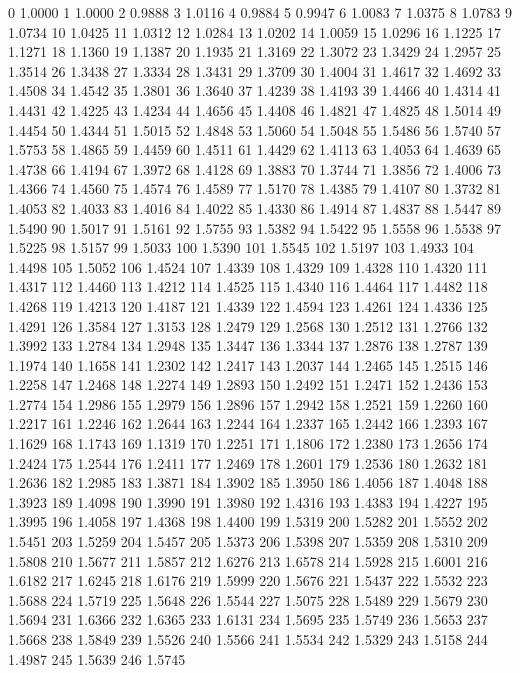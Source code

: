 0 1.0000
1 1.0000
2 0.9888
3 1.0116
4 0.9884
5 0.9947
6 1.0083
7 1.0375
8 1.0783
9 1.0734
10 1.0425
11 1.0312
12 1.0284
13 1.0202
14 1.0059
15 1.0296
16 1.1225
17 1.1271
18 1.1360
19 1.1387
20 1.1935
21 1.3169
22 1.3072
23 1.3429
24 1.2957
25 1.3514
26 1.3438
27 1.3334
28 1.3431
29 1.3709
30 1.4004
31 1.4617
32 1.4692
33 1.4508
34 1.4542
35 1.3801
36 1.3640
37 1.4239
38 1.4193
39 1.4466
40 1.4314
41 1.4431
42 1.4225
43 1.4234
44 1.4656
45 1.4408
46 1.4821
47 1.4825
48 1.5014
49 1.4454
50 1.4344
51 1.5015
52 1.4848
53 1.5060
54 1.5048
55 1.5486
56 1.5740
57 1.5753
58 1.4865
59 1.4459
60 1.4511
61 1.4429
62 1.4113
63 1.4053
64 1.4639
65 1.4738
66 1.4194
67 1.3972
68 1.4128
69 1.3883
70 1.3744
71 1.3856
72 1.4006
73 1.4366
74 1.4560
75 1.4574
76 1.4589
77 1.5170
78 1.4385
79 1.4107
80 1.3732
81 1.4053
82 1.4033
83 1.4016
84 1.4022
85 1.4330
86 1.4914
87 1.4837
88 1.5447
89 1.5490
90 1.5017
91 1.5161
92 1.5755
93 1.5382
94 1.5422
95 1.5558
96 1.5538
97 1.5225
98 1.5157
99 1.5033
100 1.5390
101 1.5545
102 1.5197
103 1.4933
104 1.4498
105 1.5052
106 1.4524
107 1.4339
108 1.4329
109 1.4328
110 1.4320
111 1.4317
112 1.4460
113 1.4212
114 1.4525
115 1.4340
116 1.4464
117 1.4482
118 1.4268
119 1.4213
120 1.4187
121 1.4339
122 1.4594
123 1.4261
124 1.4336
125 1.4291
126 1.3584
127 1.3153
128 1.2479
129 1.2568
130 1.2512
131 1.2766
132 1.3992
133 1.2784
134 1.2948
135 1.3447
136 1.3344
137 1.2876
138 1.2787
139 1.1974
140 1.1658
141 1.2302
142 1.2417
143 1.2037
144 1.2465
145 1.2515
146 1.2258
147 1.2468
148 1.2274
149 1.2893
150 1.2492
151 1.2471
152 1.2436
153 1.2774
154 1.2986
155 1.2979
156 1.2896
157 1.2942
158 1.2521
159 1.2260
160 1.2217
161 1.2246
162 1.2644
163 1.2244
164 1.2337
165 1.2442
166 1.2393
167 1.1629
168 1.1743
169 1.1319
170 1.2251
171 1.1806
172 1.2380
173 1.2656
174 1.2424
175 1.2544
176 1.2411
177 1.2469
178 1.2601
179 1.2536
180 1.2632
181 1.2636
182 1.2985
183 1.3871
184 1.3902
185 1.3950
186 1.4056
187 1.4048
188 1.3923
189 1.4098
190 1.3990
191 1.3980
192 1.4316
193 1.4383
194 1.4227
195 1.3995
196 1.4058
197 1.4368
198 1.4400
199 1.5319
200 1.5282
201 1.5552
202 1.5451
203 1.5259
204 1.5457
205 1.5373
206 1.5398
207 1.5359
208 1.5310
209 1.5808
210 1.5677
211 1.5857
212 1.6276
213 1.6578
214 1.5928
215 1.6001
216 1.6182
217 1.6245
218 1.6176
219 1.5999
220 1.5676
221 1.5437
222 1.5532
223 1.5688
224 1.5719
225 1.5648
226 1.5544
227 1.5075
228 1.5489
229 1.5679
230 1.5694
231 1.6366
232 1.6365
233 1.6131
234 1.5695
235 1.5749
236 1.5653
237 1.5668
238 1.5849
239 1.5526
240 1.5566
241 1.5534
242 1.5329
243 1.5158
244 1.4987
245 1.5639
246 1.5745
